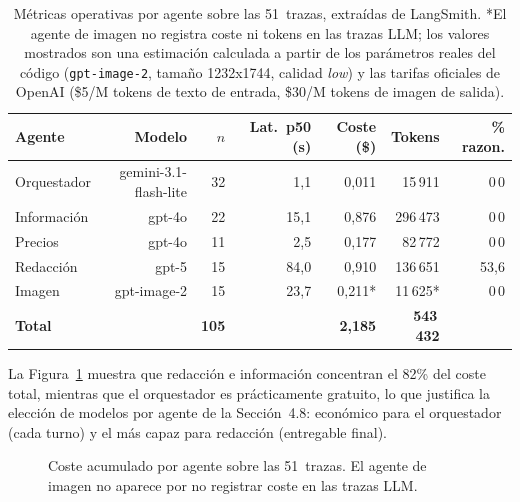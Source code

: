 \begin{table}[htbp]
\centering
\fontsize{10}{12}\selectfont
\begin{tabular}{lrrrrrr}
\toprule
Agente & Modelo & $n$ & Lat.\ p50 (s) & Coste (\$) & Tokens & \% razon. \\
\midrule
Orquestador & gemini-3.1-flash-lite & 32 & 1{,}1 & 0{,}011 & 15\,911 & 0\,0 \\
Información & gpt-4o & 22 & 15{,}1 & 0{,}876 & 296\,473 & 0\,0 \\
Precios & gpt-4o & 11 & 2{,}5 & 0{,}177 & 82\,772 & 0\,0 \\
Redacción & gpt-5 & 15 & 84{,}0 & 0{,}910 & 136\,651 & 53{,}6 \\
Imagen & gpt-image-2 & 15 & 23{,}7 & 0{,}211* & 11\,625* & 0\,0 \\
\midrule
\textbf{Total} & & \textbf{105} & & \textbf{2{,}185} & \textbf{543\,432} & \\
\bottomrule
\end{tabular}
\caption{Métricas operativas por agente sobre las 51~trazas, extraídas de LangSmith. *El agente de imagen no registra coste ni tokens en las trazas LLM; los valores mostrados son una estimación calculada a partir de los parámetros reales del código (\texttt{gpt-image-2}, tamaño 1232x1744, calidad \textit{low}) y las tarifas oficiales de OpenAI (\$5/M tokens de texto de entrada, \$30/M tokens de imagen de salida).}
\label{tab:agent-metrics}
\end{table}

La Figura~\ref{fig:cost-by-agent} muestra que redacción e información concentran el 82\% del coste total, mientras que el orquestador es prácticamente gratuito, lo que justifica la elección de modelos por agente de la Sección~4.8: económico para el orquestador (cada turno) y el más capaz para redacción (entregable final).

\begin{figure}[htbp]
\centering
{}
\caption{Coste acumulado por agente sobre las 51~trazas. El agente de imagen no aparece por no registrar coste en las trazas LLM.}
\label{fig:cost-by-agent}
\end{figure}

